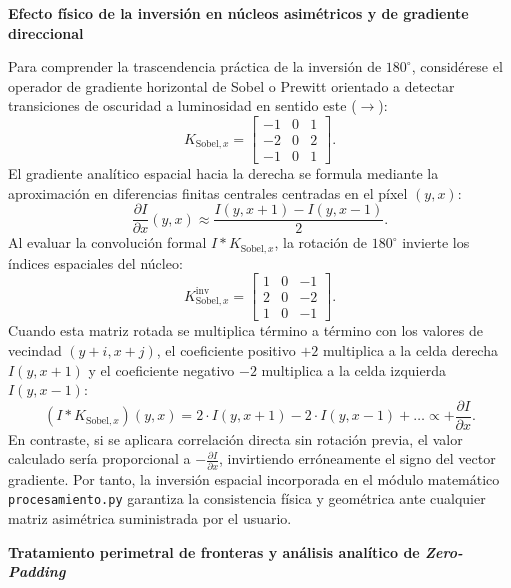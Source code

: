 \documentclass[11pt]{article}
\begin{document}
\textbf{Efecto físico de la inversión en núcleos asimétricos y de gradiente direccional}

Para comprender la trascendencia práctica de la inversión de $180^\circ$, considérese el operador de gradiente horizontal de Sobel o Prewitt orientado a detectar transiciones de oscuridad a luminosidad en sentido este ($\to$):
\begin{equation}
K_{\text{Sobel}, x} = \begin{bmatrix} -1 & 0 & 1 \\ -2 & 0 & 2 \\ -1 & 0 & 1 \end{bmatrix}.
\end{equation}
El gradiente analítico espacial hacia la derecha se formula mediante la aproximación en diferencias finitas centrales centradas en el píxel $(y, x)$:
\begin{equation}
\frac{\partial I}{\partial x}(y, x) \approx \frac{I(y, x+1) - I(y, x-1)}{2}.
\end{equation}
Al evaluar la convolución formal $I * K_{\text{Sobel}, x}$, la rotación de $180^\circ$ invierte los índices espaciales del núcleo:
\begin{equation}
K_{\text{Sobel}, x}^{\text{inv}} = \begin{bmatrix} 1 & 0 & -1 \\ 2 & 0 & -2 \\ 1 & 0 & -1 \end{bmatrix}.
\end{equation}
Cuando esta matriz rotada se multiplica término a término con los valores de vecindad $(y+i, x+j)$, el coeficiente positivo $+2$ multiplica a la celda derecha $I(y, x+1)$ y el coeficiente negativo $-2$ multiplica a la celda izquierda $I(y, x-1)$:
\begin{equation}
(I * K_{\text{Sobel}, x})(y, x) = 2 \cdot I(y, x+1) - 2 \cdot I(y, x-1) + \ldots \propto +\frac{\partial I}{\partial x}.
\end{equation}
En contraste, si se aplicara correlación directa sin rotación previa, el valor calculado sería proporcional a $-\frac{\partial I}{\partial x}$, invirtiendo erróneamente el signo del vector gradiente. Por tanto, la inversión espacial incorporada en el módulo matemático \texttt{procesamiento.py} garantiza la consistencia física y geométrica ante cualquier matriz asimétrica suministrada por el usuario.

\textbf{Tratamiento perimetral de fronteras y análisis analítico de \textit{Zero-Padding}}
\end{document}

